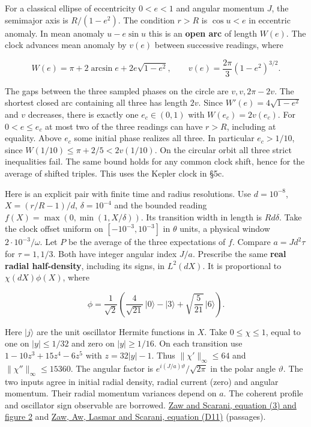 \documentclass[11pt,a4paper]{article}
\begin{document}
For a classical ellipse of eccentricity \(0<e<1\) and angular momentum
\(J\), the semimajor axis is \(R/(1-e^2)\). The condition \(r>R\) is
\(\cos u<e\) in eccentric anomaly. In mean anomaly \(u-e\sin u\) this is
an \textbf{open arc} of length \(W(e)\). The clock advances mean anomaly
by \(v(e)\) between successive readings, where

\[
 W(e)=\pi+2\arcsin e+2e\sqrt{1-e^2},\qquad
 v(e)=\frac{2\pi}{3}(1-e^2)^{3/2}.
\]

The gaps between the three sampled phases on the circle are
\(v,v,2\pi-2v\). The shortest closed arc containing all three has length
\(2v\). Since \(W'(e)=4\sqrt{1-e^2}\) and \(v\) decreases, there is
exactly one \(e_c\in(0,1)\) with \(W(e_c)=2v(e_c)\). For \(0<e\le e_c\)
at most two of the three readings can have \(r>R\), including at
equality. Above \(e_c\) some initial phase realizes all three. In
particular \(e_c>1/10\), since \(W(1/10)\le\pi+2/5<2v(1/10)\). On the
circular orbit all three strict inequalities fail. The same bound holds
for any common clock shift, hence for the average of shifted triples.
This uses the Kepler clock in §5c.

Here is an explicit pair with finite time and radius resolutions. Use
\(d=10^{-8}\), \(X=(r/R-1)/d\), \(\delta=10^{-4}\) and the bounded
reading \(f(X)=\max(0,\min(1,X/\delta))\). Its transition width in
length is \(Rd\delta\). Take the clock offset uniform on
\([-10^{-3},10^{-3}]\) in \(\theta\) units, a physical window
\(2\cdot10^{-3}/\omega\). Let \(P\) be the average of the three
expectations of \(f\). Compare \(a=Jd^2\tau\) for \(\tau=1,1/3\). Both
have integer angular index \(J/a\). Prescribe the same \textbf{real
radial half-density}, including its signs, in \(L^2(dX)\). It is
proportional to \(\chi(dX)\phi(X)\), where

\[
 \phi=\frac1{\sqrt2}
 \left(\frac4{\sqrt{21}}\,|0\rangle-|3\rangle
                  +\sqrt{\frac5{21}}\,|6\rangle\right).
\]

Here \(|j\rangle\) are the unit oscillator Hermite functions in \(X\).
Take \(0\le\chi\le1\), equal to one on \(|y|\le1/32\) and zero on
\(|y|\ge1/16\). On each transition use \(1-10z^3+15z^4-6z^5\) with
\(z=32|y|-1\). Thus \(\|\chi'\|_\infty\le64\) and
\(\|\chi''\|_\infty\le15360\). The angular factor is
\(e^{i(J/a)\vartheta}/\sqrt{2\pi}\) in the polar angle \(\vartheta\).
The two inputs agree in initial radial density, radial current (zero)
and angular momentum. Their radial momentum variances depend on \(a\).
The coherent profile and oscillator sign observable are borrowed.
\href{https://arxiv.org/pdf/2212.06017}{Zaw and Scarani, equation (3)
and figure 2} and \href{https://arxiv.org/pdf/2204.10498}{Zaw, Aw,
Lasmar and Scarani, equation (D11)} (passages).
\end{document}
